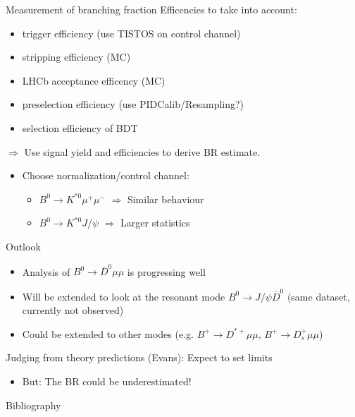 \documentclass[compress,aspectratio=43]{beamer}
\begin{document}
\begin{frame}{Measurement of branching fraction}
  Efficencies to take into account:
  \begin{itemize}
    \item trigger efficiency (use TISTOS on control channel)
    \item stripping efficiency (MC)
    \item LHCb acceptance efficency (MC)
    \item preselection efficiency (use PIDCalib/Resampling?)
    \item selection efficiency of BDT
  \end{itemize}
  $\Rightarrow$ Use signal yield and efficiencies to derive BR estimate.
  \begin{itemize}
    \item Choose normalization/control channel:
      \begin{itemize}
        \item $B^0\to K^{*0}\mu^+\mu^-$ $\Rightarrow$ Similar behaviour
        \item $B^0 \to K^{*0}J\!/\!\psi$ $\Rightarrow$ Larger statistics
      \end{itemize}
  \end{itemize}
\end{frame}

\begin{frame}{Outlook}
  \begin{itemize}
    \item Analysis of $B^0\to \overline{D}^0 \mu\mu$ is progressing well
    \item Will be extended to look at the resonant mode $B^0\to J/\psi\overline{D}^0$ (same dataset, currently not observed)
    \item Could be extended to other modes (e.g. $B^+\to D^{*+}\mu\mu$, $B^+\to D_s^+\mu\mu$)
  \end{itemize}
  Judging from theory predictions (Evans): Expect to set limits
  \begin{itemize}
    \item But: The BR could be underestimated!
  \end{itemize}
\end{frame}

\begin{frame}[allowframebreaks]{Bibliography}
  \small
  \printbibliography
\end{frame}
\end{document}
